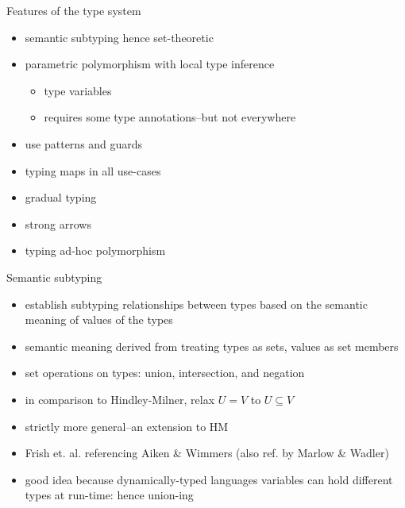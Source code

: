 \documentclass[
  ignorenonframetext,
  aspectratio=169]{beamer}
\providecommand{\tightlist}{%
  \setlength{\itemsep}{0pt}\setlength{\parskip}{0pt}}
\begin{document}
\begin{frame}{Features of the type system}
\label{features-of-the-type-system}
\begin{itemize}
\tightlist
\item
  semantic subtyping hence set-theoretic
\item
  parametric polymorphism with local type inference

  \begin{itemize}
  \tightlist
  \item
    type variables
  \item
    requires some type annotations--but not everywhere
  \end{itemize}
\item
  use patterns and guards
\item
  typing maps in all use-cases
\item
  gradual typing
\item
  strong arrows
\item
  typing ad-hoc polymorphism
\end{itemize}
\end{frame}

\begin{frame}{Semantic subtyping}
\label{semantic-subtyping}
\begin{itemize}
\tightlist
\item
  establish subtyping relationships between types based on the semantic
  meaning of values of the types
\item
  semantic meaning derived from treating types as sets, values as set
  members
\item
  set operations on types: union, intersection, and negation
\item
  in comparison to Hindley-Milner, relax \(U = V\) to \(U \subseteq V\)
\item
  strictly more general--an extension to HM
\item
  Frish et. al. referencing Aiken \& Wimmers (also ref. by Marlow \&
  Wadler)
\item
  good idea because dynamically-typed languages variables can hold
  different types at run-time: hence union-ing
\end{itemize}
\end{frame}
\end{document}
